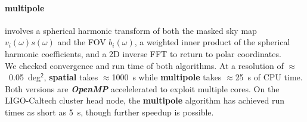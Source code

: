 \documentclass[landscape]{a0poster}
\renewcommand{\emph}[1]{{\bfseries\itshape#1}}
\begin{document}
\paragraph{multipole}
involves a spherical harmonic transform of both the masked sky map $v_i(\omega)s(\omega)$ and the FOV $b_i(\omega)$, a weighted inner product of the spherical harmonic coefficients, and a 2D inverse FFT to return to polar coordinates.\\

We checked convergence and run time of both algorithms.  At a resolution of $\approx$~0.05~deg$^\mathsf{2}$, \textbf{spatial} takes $\approx$1000~s while \textbf{multipole} takes $\approx$25~s of CPU time.  Both versions are \emph{OpenMP} accelelerated to exploit multiple cores.  On the LIGO-Caltech cluster head node, the \textbf{multipole} algorithm has achieved run times as short as 5~s, though further speedup is possible.

\vspace{1cm}
\end{document}
